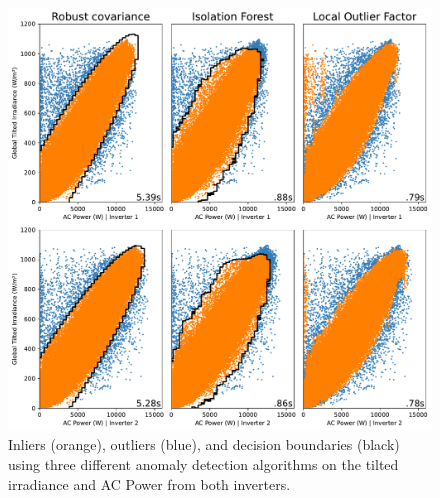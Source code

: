 \begin{figure}[h!]
    \centering
    \includegraphics[width=\textwidth]{figures/chapter5/cleaning/21_cleaning_tilted_irrad.pdf}
    \caption{Inliers (orange), outliers (blue), and decision boundaries (black) using three different anomaly detection algorithms on the tilted irradiance and AC Power from both inverters.}
    \label{fig:clean_tilted_irrad}
\end{figure}

